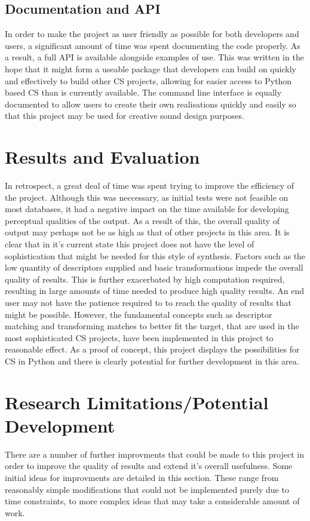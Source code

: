 \documentclass{scrartcl}
\begin{document}
    \subsection*{Documentation and API}
    In order to make the project as user friendly as possible for both
    developers and users, a significant amount of time was spent documenting
    the code properly. As a result, a full API is available alongside examples
    of use. This was written in the hope that it might form a useable package
    that developers can build on quickly and effectively to build other CS
    projects, allowing for easier access to Python based CS than is currently
    available. The command line interface is equally documented to allow users
    to create their own realisations quickly and easily so that this project
    may be used for creative sound design purposes.

    \section*{Results and Evaluation}
    In retrospect, a great deal of time was spent trying to improve the
    efficiency of the project. Although this was neccessary, as initial tests
    were not feasible on most databases, it had a negative impact on the time
    available for developing perceptual qualities of the output. As a result of
    this, the overall quality of output may perhaps not be as high as that of
    other projects in this area. It is clear that in it's current state this
    project does not have the level of sophistication that might be needed for
    this style of synthesis. Factors such as the low quantity of descriptors
    supplied and basic transformations impede the overall quality of results.
    This is further exacerbated by high computation required, resulting in
    large amounts of time needed to produce high quality results. An end user
    may not have the patience required to to reach the quality of results that
    might be possible. However, the fundamental concepts such as descriptor
    matching and transforming matches to better fit the target, that are used
    in the most sophisticated CS projects, have been implemented in this
    project to reasonable effect. As a proof of concept, this project displays
    the possibilities for CS in Python and there is clearly potential for
    further development in this area.

    \section*{Research Limitations/Potential Development}
    There are a number of further improvments that could be made to this
    project in order to improve the quality of results and extend it's overall
    usefulness. Some initial ideas for improvments are detailed in this
    section. These range from reasonably simple modifications that could not be
    implemented purely due to time constraints, to more complex ideas that may
    take a considerable amount of work.
\end{document}
